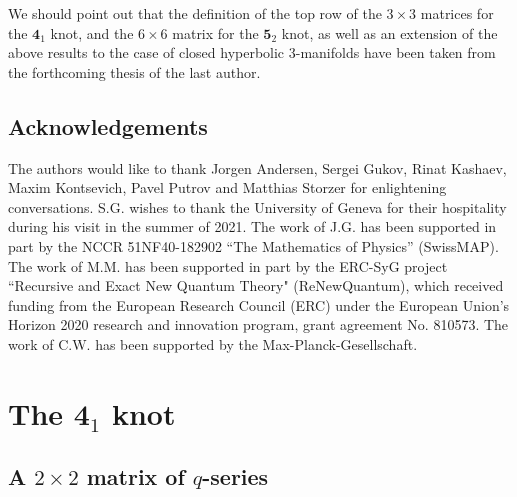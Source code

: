 \documentclass[12pt,reqno]{amsart}
\theoremstyle{definition}
\def\md{\mathbf}
\newcommand{\knot}[1]{\md{#1}}
\begin{document}
We should point out that the definition of the top row of the $3 \times 3$ matrices
for the $\knot{4}_1$ knot, and the $6 \times 6$ matrix for the $\knot{5}_2$ knot, as well as an
extension of the above results to the case of closed hyperbolic 3-manifolds have
been taken from the forthcoming thesis of the last author.

\subsection*{Acknowledgements} 
The authors would like to thank Jorgen Andersen, Sergei Gukov, Rinat Kashaev, 
Maxim Kontsevich, Pavel Putrov and Matthias Storzer for enlightening conversations.
S.G. wishes to thank the University of Geneva for their hospitality during his visit
in the summer of 2021. The work of J.G. has been supported in part by the
NCCR 51NF40-182902 ``The Mathematics of Physics'' (SwissMAP). The work of M.M. has
been supported in part by the ERC-SyG project ``Recursive and Exact New
Quantum Theory" (ReNewQuantum), which received funding from the
European Research Council (ERC) under the European Union's Horizon
2020 research and innovation program, grant agreement No. 810573. The work of C.W. has been supported by the Max-Planck-Gesellschaft.


\section{The $\knot{4}_1$ knot}
\label{sec.41}

\subsection{A $2 \times 2$ matrix of $q$-series}
\label{sub.41q2}
\end{document}

